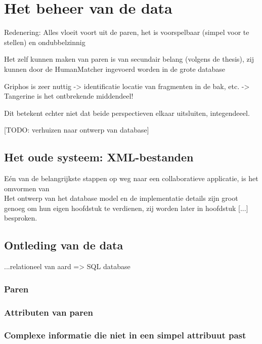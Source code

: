 \section{Het beheer van de data}

Redenering: Alles vloeit voort uit de paren, het is voorspelbaar (simpel voor te stellen) en ondubbelzinnig

Het zelf kunnen maken van paren is van secundair belang (volgens de thesis), zij kunnen door de HumanMatcher ingevoerd worden in de grote database

Griphos is zeer nuttig -> identificatie locatie van fragmenten in de bak, etc. -> Tangerine is het ontbrekende middendeel!

Dit betekent echter niet dat beide perspectieven elkaar uitsluiten, integendeeel.
 
[TODO: verhuizen naar ontwerp van database]

\subsection{Het oude systeem: XML-bestanden}

E\'en van de belangrijkste stappen op weg naar een collaboratieve applicatie, is het omvormen van\\

Het ontwerp van het database model en de implementatie details zijn groot genoeg om hun eigen hoofdstuk te verdienen, zij worden later in hoofdstuk [...] besproken.\\

\subsection{Ontleding van de data}
...relationeel van aard => SQL database

\subsubsection{Paren}

\subsubsection{Attributen van paren}

\subsubsection{Complexe informatie die niet in een simpel attribuut past}

